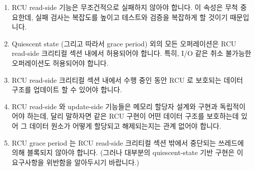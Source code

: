 \begin{enumerate}
\item	RCU read-side 기능은 무조건적으로 실패하지 않아야 합니다.
	이 속성은 무척 중요한데, 실패 검사는 복잡도를 높이고 테스트와 검증을
	복잡하게 할 것이기 때문입니다.
\item	Quiescent state (그리고 따라서 grace period) 외의 모든 오퍼레이션은 RCU
	read-side 크리티컬 섹션 내에서 허용되어야 합니다.
	특히, I/O 같은 취소 불가능한 오퍼레이션도 허용되어야 합니다.
\item	RCU read-side 크리티컬 섹션 내에서 수행 중인 동안 RCU 로 보호되는
	데이터 구조를 업데이트 할 수 있어야 합니다.
\item	RCU read-side 와 update-side 기능들은 메모리 할당자 설계와 구현과
	독립적이어야 하는데, 달리 말하자면 같은 RCU 구현이 어떤 데이터 구조를
	보호하는데 있어 그 데이터 원소가 어떻게 할당되고 해제되는지는 관계
	없어야 합니다.
\item	RCU grace period 는 RCU read-side 크리티컬 섹션 밖에서 중단되는
	쓰레드에 의해 블록되지 않아야 합니다.
	(그러나 대부분의 quiescent-state 기반 구현은 이 요구사항을 위반함을
	알아두시기 바랍니다.)

\iffalse

\item	RCU read-side primitives should be unconditional, with no
	failure returns.
	This property is extremely important, as failure checking
	increases complexity and complicates testing and validation.
\item	Any operation other than a quiescent state (and thus a grace
	period) should be permitted in an RCU read-side critical section.
	In particular, irrevocable operations such as I/O should be
	permitted.
\item	It should be possible to update an RCU-protected data structure
	while executing within an RCU read-side critical section.
\item	Both RCU read-side and update-side primitives should be independent
	of memory allocator design and implementation, in other words,
	the same RCU implementation should be able to protect a given
	data structure regardless of how the data elements are allocated
	and freed.
\item	RCU grace periods should not be blocked by threads that
	halt outside of RCU read-side critical sections.
	(But note that most quiescent-state-based implementations
	violate this desideratum.)

\fi

\end{enumerate}

